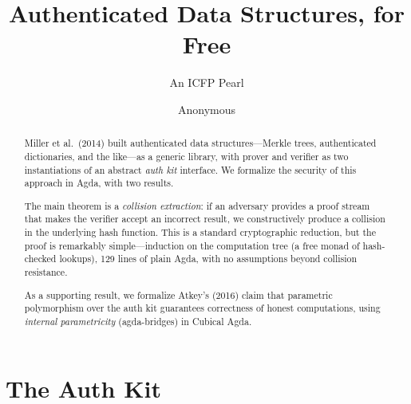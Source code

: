 \documentclass[acmsmall,screen,review,anonymous]{acmart}
\begin{document}
\title{Authenticated Data Structures, for Free}
\subtitle{An ICFP Pearl}

\author{Anonymous}

\begin{abstract}
Miller et al.\ (2014) built authenticated data structures---Merkle
trees, authenticated dictionaries, and the like---as a generic
library, with prover and verifier as two instantiations of an abstract
\emph{auth kit} interface.  We formalize the security of this approach
in Agda, with two results.

The main theorem is a \emph{collision extraction}: if an adversary
provides a proof stream that makes the verifier accept an incorrect
result, we constructively produce a collision in the underlying hash
function.  This is a standard cryptographic reduction, but the proof
is remarkably simple---induction on the computation tree (a free monad
of hash-checked lookups), 129 lines of plain Agda, with no
assumptions beyond collision resistance.

As a supporting result, we formalize Atkey's (2016) claim that
parametric polymorphism over the auth kit guarantees correctness of
honest computations, using \emph{internal parametricity}
(agda-bridges) in Cubical Agda.
\end{abstract}

\maketitle



\section{The Auth Kit}\label{sec:auth-kit}
\end{document}
